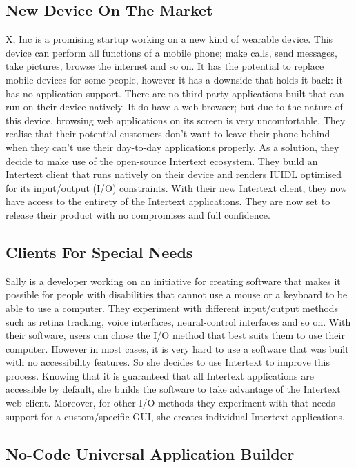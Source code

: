 \subsection{New Device On The Market}

X, Inc is a promising startup working on a new kind of wearable device. This device can perform all functions of a mobile phone; make calls, send messages, take pictures, browse the internet and so on. It has the potential to replace mobile devices for some people, however it has a downside that holds it back: it has no application support. There are no third party applications built that can run on their device natively. It do have a web browser; but due to the nature of this device, browsing web applications on its screen is very uncomfortable. They realise that their potential customers don't want to leave their phone behind when they can't use their day-to-day applications properly. As a solution, they decide to make use of the open-source Intertext ecosystem. They build an Intertext client that runs natively on their device and renders IUIDL optimised for its input/output (I/O) constraints. With their new Intertext client, they now have access to the entirety of the Intertext applications. They are now set to release their product with no compromises and full confidence.

\subsection{Clients For Special Needs}

Sally is a developer working on an initiative for creating software that makes it possible for people with disabilities that cannot use a mouse or a keyboard to be able to use a computer. They experiment with different input/output methods such as retina tracking, voice interfaces, neural-control interfaces and so on. With their software, users can chose the I/O method that best suits them to use their computer. However in most cases, it is very hard to use a software that was built with no accessibility features. So she decides to use Intertext to improve this process. Knowing that it is guaranteed that all Intertext applications are accessible by default, she builds the software to take advantage of the Intertext web client. Moreover, for other I/O methods they experiment with that needs support for a custom/specific GUI, she creates individual Intertext applications.

\subsection{No-Code Universal Application Builder}

